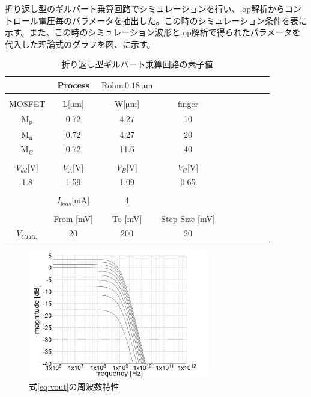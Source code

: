 \documentclass[twocolumn]{jsarticle}
\begin{document}
    折り返し型のギルバート乗算回路でシミュレーションを行い、.op解析からコントロール電圧毎のパラメータを抽出した。この時のシミュレーション条件を表に示す。また、この時のシミュレーション波形と.op解析で得られたパラメータを代入した理論式のグラフを図、に示す。
    \begin{table}[h]
        \caption{折り返し型ギルバート乗算回路の素子値}
        \label{table:state_folded_ac}
        \centering
        \begin{tabular}{cccccccccc}
            \hline
            &Process&$\mathrm{Rohm\,0.18\,\mu m}$&\\
            \hline
            &&&\\
            MOSFET & L[$\mathrm{\mu m}$] & W[$\mathrm{\mu m}$] & finger\\
            \hline \hline
            $\mathrm{M_{p}}$ & 0.72 & 4.27 & 10 \\
            $\mathrm{M_{n}}$ & 0.72 & 4.27 & 20 \\
            $\mathrm{M_{C}}$ & 0.72 & 11.6 & 40 \\
            &&&\\
            $V_{dd}$[V] & $V_{A}$[V] & $V_{B}$[V] & $V_{C}$[V]\\
            \hline\hline
            1.8 & 1.59 & 1.09 & 0.65 \\
            &&&\\
            \hline\hline
            & $I_{bias}$[mA] & 4 & \\
            \hline\hline
            &&&\\
            & From [mV] & To [mV] &  Step Size [mV]   \\
            \hline\hline
            $V_{CTRL}$ & 20 & 200 & 20

        \end{tabular}
    \end{table}
    \begin{figure}[H]
        \begin{center}
            \includegraphics*[width = 80mm]{figures/vout_ac_theoretical_monochrome.PNG}
            \caption{式\eqref{eq:vout}の周波数特性}
            \label{fig:vout_theoretical}
        \end{center}
    \end{figure}
\end{document}
